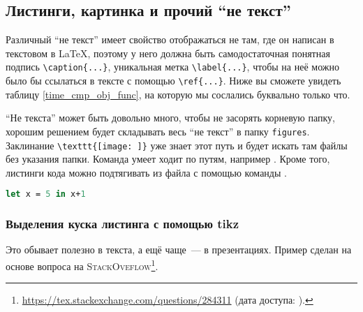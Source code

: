 \subsection{Листинги, картинка и прочий \enquote{не текст}}

Различный \enquote{не текст} имеет свойство отображаться не там, где он написан в текстовом в \LaTeX{}, поэтому у него должна быть самодостаточ\-ная понятная подпись \verb=\caption{...}=, уникальная метка \verb=\label{...}=, чтобы на неё можно было бы ссылаться в тексте с помощью \verb=\ref{...}=. Ниже вы сможете увидеть таблицу \ref{time_cmp_obj_func}, на которую мы сослались буквально только что.

\enquote{Не текста} может быть довольно много, чтобы не засорять корневую папку, хорошим решением будет складывать весь \enquote{не текст} в папку \texttt{figures}.
Заклинание \verb=\texttt{[image: ]}= уже знает этот путь и будет искать там файлы без указания папки.
Команда \verb== умеет ходит по путям, например \verb==.
Кроме того, листинги кода можно подтягивать из файла с помощью команды \verb==.

\begin{lstlisting}[caption={Название для листинга кода. Достаточно длинное, чтобы люди, которые смотрят картинку сразу после названия статьи (т.~е. все люди), смогли разобраться и понять к чему в статье листинги, картинки и прочий \enquote{не текст}.}, language=Caml, frame=single]
  let x = 5 in x+1
\end{lstlisting}



\subsubsection{Выделения куска листинга с помощью tikz}
Это обывает полезно в текста, а ещё чаще~--- в презентациях. Пример сделан на основе вопроса на \textsc{StackOveflow}\footnote{\url{https://tex.stackexchange.com/questions/284311} (дата доступа:   ).}.

